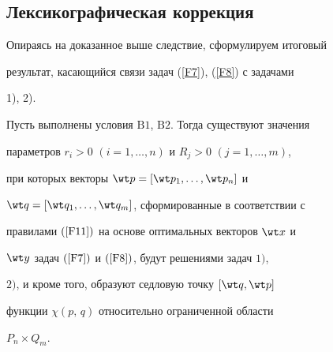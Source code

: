 




\subsection{Лексикографическая коррекция}





Опираясь на доказанное выше следствие, сформулируем итоговый


результат, касающийся связи задач (\ref{F7}), (\ref{F8}) с задачами


1), 2).





\begin{thm}


Пусть выполнены условия $\mathrm B1$, $\mathrm B2$. Тогда существуют значения


параметров $r_i>0$ $(i=1,\dotsc,n)$ и $R_j>0$ $(j=1,\dotsc,m)$,


при которых векторы $\wt p=[\wt p_1,\dotsc,\wt p_n]$ и


$\wt q=[\wt q_1,\dotsc,\wt q_m]$, сформированные в соответствии с


правилами $(\ref{F11})$ на основе оптимальных векторов $\wt x$ и


$\wt y$ задач $(\ref{F7})$ и $(\ref{F8})$, будут решениями задач $1)$,


$2)$, и кроме того, образуют седловую точку $[\wt q, \wt p]$


функции $\chi(p,\,q)$ относительно ограниченной области


$P_n\times Q_m$.


\end{thm}





